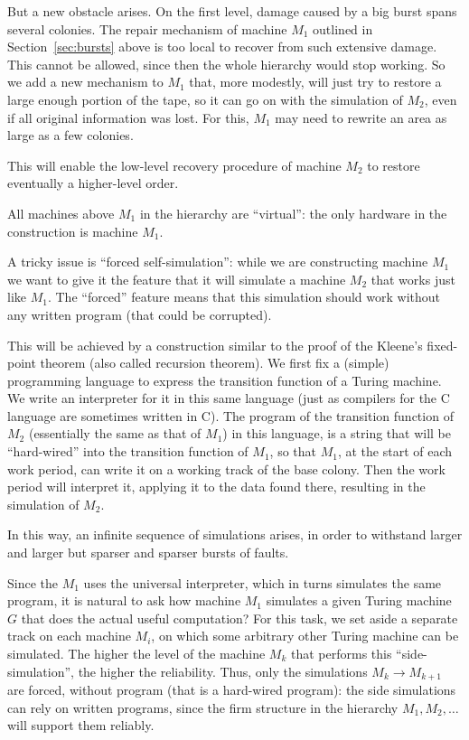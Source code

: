 \documentclass[12pt]{memoir}
\begin{document}
But a new obstacle arises.
On the first level, damage caused by a big burst spans several colonies.
The repair mechanism of machine \( M_1 \) outlined in Section~\ref{sec:bursts} above 
is too local to recover from such extensive damage.
This cannot be allowed, since then the whole hierarchy would stop working.
So we add a new mechanism to \( M_{1} \) that, more modestly,
will just try to restore a large enough portion of the
tape, so it can go on with the simulation of \( M_2 \), even if all 
original information was lost.
For this, \( M_{1} \) may need to rewrite an area as large as a few colonies.

This will enable the low-level recovery procedure of 
machine \( M_{2} \) to restore eventually a higher-level order.

All machines above \( M_1 \) in the hierarchy are
``virtual'': the only hardware in the construction is machine \( M_1 \).

A tricky issue is ``forced self-simulation'': while we are constructing machine \( M_1 \)
we want to give it the feature that it will simulate a machine \( M_{2} \) that
works just like \( M_{1} \).
The ``forced'' feature means that this simulation should
work without any written program (that could be corrupted).

This will be achieved by
a construction similar to the proof of the Kleene's fixed-point 
theorem (also called recursion theorem).
We first fix a (simple) programming language to express the transition
function of a Turing machine.
We write an interpreter for it in this same language (just as compilers for the 
C language are sometimes written in C).
The program of the transition function of \( M_{2} \)
(essentially the same as that of \( M_{1} \))
in this language, is a string that will be
``hard-wired'' into the transition function of \( M_{1} \), 
so that \( M_{1} \), at the start of each work period, can write
it on a working track of the base colony.
Then the work period will interpret it, 
applying it to the data found there, resulting
in the simulation of \( M_{2} \).

In this way, an infinite sequence of simulations arises, in order
to withstand larger and larger but sparser and sparser bursts of faults.

Since the \( M_1 \) uses the universal interpreter, which in turns
simulates the same program, it is natural to ask
how  machine \( M_1 \) simulates a given Turing machine \( G \) that does the 
actual useful computation?
For this task, we set aside a separate track 
on each machine \( M_i \), on which some arbitrary other Turing machine can be
simulated.
The higher the level of the machine \( M_{k} \) that performs this
``side-simulation'', the higher the reliability.
Thus, only the simulations \( M_{k}\to M_{k+1} \) are forced, without program
(that is a hard-wired program):
the side simulations can rely on written programs, since the firm
structure in the hierarchy \( M_{1},M_{2},\dots \) will support them reliably.
\end{document}
